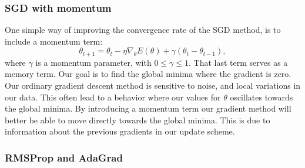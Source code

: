 \subsubsection{SGD with momentum}
One simple way of improving the convergence rate of the SGD method, is to
include a momentum term: 
\begin{equation*}
    \theta _{t+1} = \theta _t - \eta \nabla_\theta E(\theta )+\gamma (\theta_t
    -\theta_{t-1}     ) ,
\end{equation*}
where $\gamma $ is a momentum parameter, with $0\leq \gamma \leq1$. That last
term serves as a memory term. Our goal is to find the
global minima where the gradient is zero. Our ordinary gradient descent method
is sensitive to noise, and local variations in our data.
This often lead to a behavior where our values for $\theta $ oscillates
towards the global minima. %
By introducing a momentum term our gradient method will better be able to move
directly towards the global minima. This is due to information about the previous
gradients in our update scheme.     

\subsubsection{RMSProp and AdaGrad}

